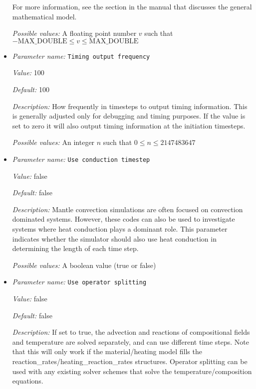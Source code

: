 \begin{itemize}
For more information, see the section in the manual that discusses the general mathematical model.


{\it Possible values:} A floating point number $v$ such that $-\text{MAX\_DOUBLE} \leq v \leq \text{MAX\_DOUBLE}$
\item {\it Parameter name:} {\tt Timing output frequency}
\label{parameters:Timing output frequency}


{\it Value:} 100


{\it Default:} 100


{\it Description:} How frequently in timesteps to output timing information. This is generally adjusted only for debugging and timing purposes. If the value is set to zero it will also output timing information at the initiation timesteps.


{\it Possible values:} An integer $n$ such that $0\leq n \leq 2147483647$
\item {\it Parameter name:} {\tt Use conduction timestep}
\label{parameters:Use conduction timestep}


{\it Value:} false


{\it Default:} false


{\it Description:} Mantle convection simulations are often focused on convection dominated systems. However, these codes can also be used to investigate systems where heat conduction plays a dominant role. This parameter indicates whether the simulator should also use heat conduction in determining the length of each time step.


{\it Possible values:} A boolean value (true or false)
\item {\it Parameter name:} {\tt Use operator splitting}
\label{parameters:Use operator splitting}


{\it Value:} false


{\it Default:} false


{\it Description:} If set to true, the advection and reactions of compositional fields and temperature are solved separately, and can use different time steps. Note that this will only work if the material/heating model fills the reaction\_rates/heating\_reaction\_rates structures. Operator splitting can be used with any existing solver schemes that solve the temperature/composition equations.



\end{itemize}
